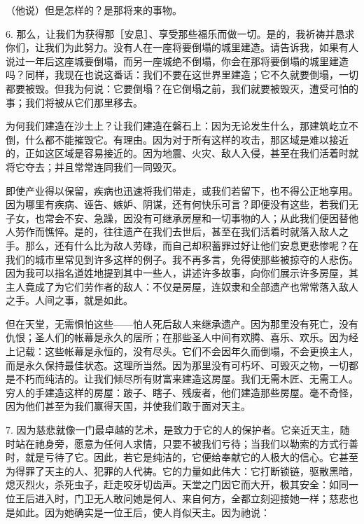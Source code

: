 （他说）但是怎样的？是那将来的事物。\par

6. 那么，让我们为获得那［安息］、享受那些福乐而做一切。是的，我祈祷并恳求你们，让我们为此努力。没有人在一座将要倒塌的城里建造。请告诉我，如果有人说过一年后这座城要倒塌，而另一座城绝不倒塌，你会在那将要倒塌的城里建造吗？同样，我现在也说这番话：我们不要在这世界里建造；它不久就要倒塌，一切都要被毁。但我为何说：它要倒塌？在它倒塌之前，我们就要被毁灭，遭受可怕的事；我们将被从它们那里移去。\par

为何我们建造在沙土上？让我们建造在磐石上：因为无论发生什么，那建筑屹立不倒，什么都不能摧毁它。有理由。因为对于所有这样的攻击，那区域是难以接近的，正如这区域是容易接近的。因为地震、火灾、敌人入侵，甚至在我们活着时就将它夺去；并且常常连同我们一同毁灭。\par

即使产业得以保留，疾病也迅速将我们带走，或我们若留下，也不得公正地享用。因为哪里有疾病、诬告、嫉妒、阴谋，还有何快乐可言？即便没有这些，若我们无子女，也常会不安、急躁，因没有可继承房屋和一切事物的人；从此我们便因替他人劳作而憔悴。是的，往往遗产在我们去世后，甚至在我们活着时就落入敌人之手。那么，还有什么比为敌人劳碌，而自己却积蓄罪过好让他们安息更悲惨呢？在我们的城市里常见到许多这样的例子。我不再多言，免得使那些被掠夺的人悲伤。因为我可以指名道姓地提到其中一些人，讲述许多故事，向你们展示许多房屋，其主人竟成了为它们劳作者的敌人：不仅是房屋，连奴隶和全部遗产也常常落入敌人之手。人间之事，就是如此。\par

但在天堂，无需惧怕这些——怕人死后敌人来继承遗产。因为那里没有死亡，没有仇恨；圣人们的帐幕是永久的居所；在那些圣人中间有欢腾、喜乐、欢乐。因为经上记载：这些帐幕是永恒的，没有尽头。它们不会因年久而倒塌，不会更换主人，而是永久保持最佳状态。这理所当然。因为那里没有可朽坏、可毁灭之物，一切都是不朽而纯洁的。让我们倾尽所有财富来建造这房屋。我们无需木匠、无需工人。穷人的手建造这样的房屋：跛子、瞎子、残废者，他们建造那些房屋。毫不奇怪，因为他们甚至为我们赢得天国，并使我们敢于面对天主。\par

7. 因为慈悲就像一门最卓越的艺术，是致力于它的人的保护者。它亲近天主，随时站在祂身旁，愿意为任何人求情，只要不被我们亏待；当我们以勒索的方式行善时，就是亏待了它。因此，若它是纯洁的，它便给奉献它的人极大的信心。它甚至为得罪了天主的人、犯罪的人代祷。它的力量如此伟大：它打断锁链，驱散黑暗，熄灭烈火，杀死虫子，赶走咬牙切齿声。天堂之门因它而大开，极其安全：如同一位王后进入时，门卫无人敢问她是何人、来自何方，全都立刻迎接她一样；慈悲也是如此。因为她确实是一位王后，使人肖似天主。因为祂说：\par

